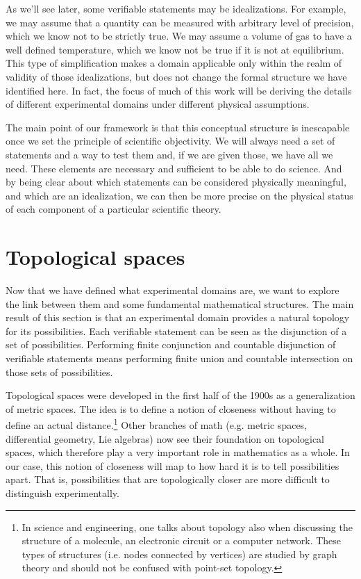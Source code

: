 \documentclass[11pt,letterpaper,fleqn]{memoir} %
\begin{document}
As we'll see later, some verifiable statements may be idealizations. For example, we may assume that a quantity can be measured with arbitrary level of precision, which we know not to be strictly true. We may assume a volume of gas to have a well defined temperature, which we know not be true if it is not at equilibrium. This type of simplification makes a domain applicable only within the realm of validity of those idealizations, but does not change the formal structure we have identified here. In fact, the focus of much of this work will be deriving the details of different experimental domains under different physical assumptions.

The main point of our framework is that this conceptual structure is inescapable once we set the principle of scientific objectivity. We will always need a set of statements and a way to test them and, if we are given those, we have all we need. These elements are necessary and sufficient to be able to do science. And by being clear about which statements can be considered physically meaningful, and which are an idealization, we can then be more precise on the physical status of each component of a particular scientific theory.

\section{Topological spaces}

Now that we have defined what experimental domains are, we want to explore the link between them and some fundamental mathematical structures. The main result of this section is that an experimental domain provides a natural topology for its possibilities. Each verifiable statement can be seen as the disjunction of a set of possibilities. Performing finite conjunction and countable disjunction of verifiable statements means performing finite union and countable intersection on those sets of possibilities.

Topological spaces were developed in the first half of the 1900s as a generalization of metric spaces. The idea is to define a notion of closeness without having to define an actual distance.\footnote{In science and engineering, one talks about topology also when discussing the structure of a molecule, an electronic circuit or a computer network. These types of structures (i.e. nodes connected by vertices) are studied by graph theory and should not be confused with point-set topology.} Other branches of math (e.g. metric spaces, differential geometry, Lie algebras) now see their foundation on topological spaces, which therefore play a very important role in mathematics as a whole. In our case, this notion of closeness will map to how hard it is to tell possibilities apart. That is, possibilities that are topologically closer are more difficult to distinguish experimentally.
\end{document}
